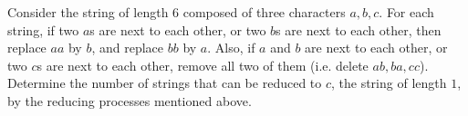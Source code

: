 Consider the string of length $6$ composed of three characters $a, b, c$. For each string, if two $a$s are next to each other, or two $b$s are next to each other, then replace $aa$ by $b$, and replace $bb$ by $a$. Also, if $a$ and $b$ are next to each other, or two $c$s are next to each other, remove all two of them (i.e. delete $ab, ba, cc$). Determine the number of strings that can be reduced to $c$, the string of length $1$, by the reducing processes mentioned above.